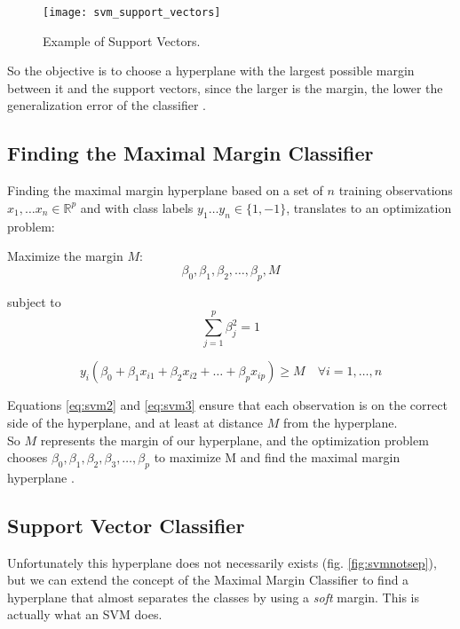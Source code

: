 \begin{figure}[H]
	\centering
	\texttt{[image: svm\_support\_vectors]}
	\caption{Example of Support Vectors.}
	\label{fig:suppvec}
\end{figure}

So the objective is to choose a hyperplane with the largest possible margin between it and the support vectors, since the larger is the margin, the lower the generalization error of the classifier \cite{ISLR}.

\subsection{Finding the Maximal Margin Classifier}
Finding the maximal margin hyperplane based on a set of $n$ training observations $x_1, \dots x_n \in \mathbb{R}^p$ and with class labels $y_1 \dots y_n \in \{1, -1\}$, translates to an optimization problem:

Maximize the margin $M$:
\begin{equation} \label{eq:svm1}
	\beta_0, \beta_1, \beta_2, \dots, \beta_p, M
\end{equation}

subject to
\begin{equation} \label{eq:svm2}
	\sum_{j=1}^{p}\beta^2_j = 1
\end{equation}

\begin{equation} \label{eq:svm3}
	y_i(\beta_0 + \beta_1 x_{i1} + \beta_2 x_{i2} + \dots + \beta_p x_{ip}) \ge M \quad \forall i = 1, \dots, n
\end{equation}

Equations \ref{eq:svm2} and \ref{eq:svm3} ensure that each observation is on the correct side of the hyperplane, and at least at distance $M$ from the hyperplane. \\
So $M$ represents the margin of our hyperplane, and the optimization problem chooses $\beta_0, \beta_1, \beta_2, \beta_3, \dots, \beta_p$ to maximize M and find the maximal margin hyperplane \cite{ISLR}.

\subsection{Support Vector Classifier}
Unfortunately this hyperplane does not necessarily exists (fig. \ref{fig:svmnotsep}), but we can extend the concept of the Maximal Margin Classifier to find a hyperplane that almost separates the classes by using a \textit{soft} margin. This is actually what an SVM does.

